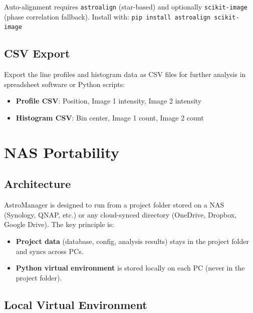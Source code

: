 \documentclass[11pt,a4paper]{article}
\begin{document}
\begin{warningbox}
Auto-alignment requires \texttt{astroalign} (star-based) and optionally \texttt{scikit-image} (phase correlation fallback). Install with: \texttt{pip install astroalign scikit-image}
\end{warningbox}

\subsection{CSV Export}

Export the line profiles and histogram data as CSV files for further analysis in spreadsheet software or Python scripts:

\begin{itemize}
    \item \textbf{Profile CSV}: Position, Image 1 intensity, Image 2 intensity
    \item \textbf{Histogram CSV}: Bin center, Image 1 count, Image 2 count
\end{itemize}


\section{NAS Portability}
\label{sec:nas}

\subsection{Architecture}

AstroManager is designed to run from a project folder stored on a NAS (Synology, QNAP, etc.) or any cloud-synced directory (OneDrive, Dropbox, Google Drive). The key principle is:

\begin{itemize}
    \item \textbf{Project data} (database, config, analysis results) stays in the project folder and syncs across PCs.
    \item \textbf{Python virtual environment} is stored locally on each PC (never in the project folder).
\end{itemize}

\subsection{Local Virtual Environment}
\end{document}
